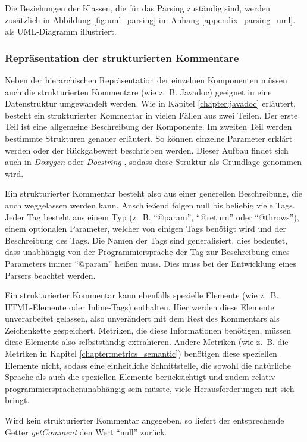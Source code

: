 Die Beziehungen der Klassen, die für das Parsing zuständig sind, werden zusätzlich in Abbildung \ref{fig:uml_parsing} im Anhang \ref{appendix_parsing_uml}. als UML-Diagramm illustriert.

\subsubsection{Repräsentation der strukturierten Kommentare}\label{chapter:structured_comments}
Neben der hierarchischen Repräsentation der einzelnen Komponenten müssen auch die strukturierten Kommentare (wie z.~B. Javadoc) geeignet in eine Datenstruktur umgewandelt werden. Wie in Kapitel \ref{chapter:javadoc}
 erläutert, besteht ein strukturierter Kommentar in vielen Fällen aus zwei Teilen. Der erste Teil ist eine allgemeine Beschreibung der Komponente. Im zweiten Teil werden bestimmte Strukturen genauer erläutert. So können einzelne Parameter erklärt werden oder der Rückgabewert beschrieben werden. 
 Dieser Aufbau findet sich auch in \textit{Doxygen} \cite{doxygen} oder \textit{Docstring} \cite{docstring}, sodass diese Struktur als Grundlage genommen wird. 
 
 Ein strukturierter Kommentar besteht also aus einer generellen Beschreibung, die auch weggelassen werden kann. Anschließend folgen null bis beliebig viele Tags. Jeder Tag besteht aus einem Typ (z.~B. \enquote{@param}, \enquote{@return} oder \enquote{@throws}), einem optionalen Parameter, welcher von einigen Tags benötigt wird und der Beschreibung des Tags. Die Namen der Tags sind generalisiert, dies bedeutet, dass unabhängig von der Programmiersprache der Tag zur Beschreibung eines Parameters immer \enquote{@param} heißen muss. Dies muss bei der Entwicklung eines Parsers beachtet werden. 
 
 Ein strukturierter Kommentar kann ebenfalls spezielle Elemente (wie z.~B. \ac{HTML}-Elemente oder Inline-Tags) enthalten. Hier werden diese Elemente unverarbeitet gelassen, also unverändert mit dem Rest des Kommentars als Zeichenkette gespeichert. Metriken, die diese Informationen benötigen, müssen diese Elemente also selbstständig extrahieren. Andere Metriken (wie z.~B. die Metriken in Kapitel \ref{chapter:metrics_semantic}) benötigen diese speziellen Elemente nicht, sodass eine einheitliche Schnittstelle, die sowohl die natürliche Sprache als auch die speziellen Elemente berücksichtigt und  zudem relativ programmiersprachenunabhängig sein müsste, viele Herausforderungen mit sich bringt.   
 
 Wird kein strukturierter Kommentar angegeben, so liefert der entsprechende Getter \textit{getComment} den Wert \enquote{null} zurück. 
